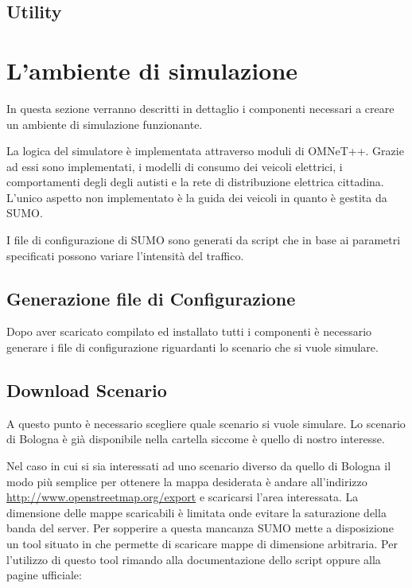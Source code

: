 \subsection{Utility}

\section{L'ambiente di simulazione}

In questa sezione verranno descritti in dettaglio i componenti necessari a creare un ambiente di simulazione funzionante.

La logica del simulatore è implementata attraverso moduli di OMNeT++. Grazie ad essi sono implementati, i modelli di consumo dei veicoli elettrici, i comportamenti degli degli autisti e la rete di distribuzione elettrica cittadina. L'unico aspetto non implementato è la guida dei veicoli in quanto è gestita da SUMO.

I file di configurazione di SUMO sono generati da script che in base ai parametri specificati possono variare l'intensità del traffico.


\subsection{Generazione file di Configurazione}

Dopo aver scaricato compilato ed installato tutti i componenti è necessario generare i file di configurazione riguardanti lo scenario che si vuole simulare. 

\subsection{Download Scenario}

A questo punto è necessario scegliere quale scenario si vuole simulare. Lo scenario di Bologna è già disponibile nella cartella  siccome è quello di nostro interesse.

Nel caso in cui si sia interessati ad uno scenario diverso da quello di Bologna il modo più semplice per ottenere la mappa desiderata è andare all'indirizzo \url{http://www.openstreetmap.org/export} e scaricarsi l'area interessata. La dimensione delle mappe scaricabili è limitata onde evitare la saturazione della banda del server. Per sopperire a questa mancanza SUMO mette a disposizione un tool situato in  che permette di scaricare mappe di dimensione arbitraria. Per l'utilizzo di questo tool rimando alla documentazione dello script oppure alla pagine ufficiale:

